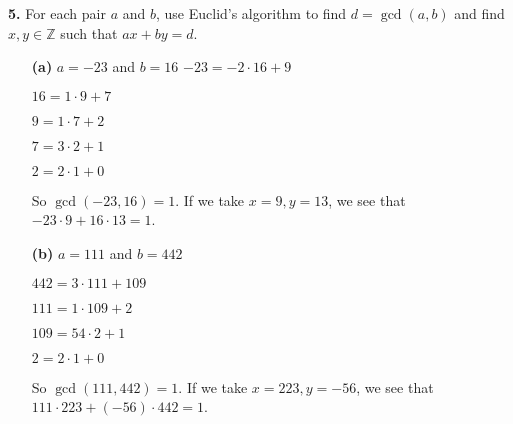 \documentclass[12pt]{amsart}
\def\ZZ{{\mathbb Z}}
\begin{document}
\medskip

{\bf 5.}  For each pair $a$ and $b$, use Euclid's algorithm to find $d=\gcd(a,b)$ and find $x,y\in\ZZ$ such that $ax+by=d$.
\begin{itemize}
\item[{\bf (a)}] $a=-23$ and $b=16$
\medskip
$-23 = -2 \cdot 16 + 9$

$16 = 1\cdot 9 + 7$

$9 = 1 \cdot 7 + 2$

$7 = 3 \cdot 2 + 1$

$2 = 2\cdot 1 + 0$

So $\gcd(-23, 16) = 1$. If we take $x=9, y = 13$, we see that $-23\cdot9 + 16\cdot 13 = 1$.
\medskip
\item[{\bf (b)}] $a=111$ and $b=442$
\medskip

$442 = 3 \cdot 111 + 109$

$111 = 1 \cdot 109 + 2$

$109 = 54 \cdot 2 + 1$

$2 = 2 \cdot 1 + 0$

So $\gcd(111, 442) = 1$. If we take $x=223, y = -56$, we see that $111\cdot 223 + (-56)\cdot 442 = 1$.

\medskip

\end{itemize}

\medskip
\end{document}
